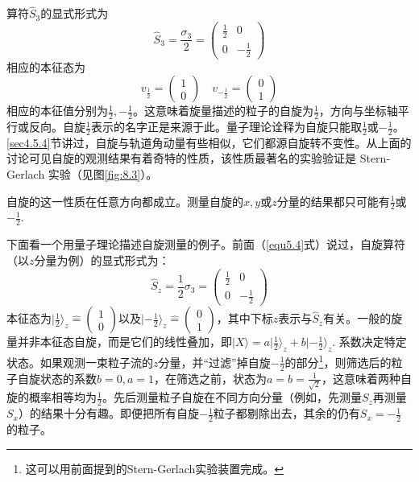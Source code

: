 算符$\hat{S}_3$的显式形式为
\begin{equation}
	\hat{S}_3 = \frac{\sigma_3}{2} =
		\begin{pmatrix}
			\frac{1}{2} & 0 \\
			0 & -\frac{1}{2}
		\end{pmatrix}
\label{equ8.46}
\end{equation}
相应的本征态为
\begin{equation}
	v_{\frac{1}{2}} =
		\begin{pmatrix}
			1 \\ 0
		\end{pmatrix}
	\quad
	v_{-\frac{1}{2}} =
		\begin{pmatrix}
			0 \\ 1
		\end{pmatrix}
\label{equ8.47}
\end{equation}
相应的本征值分别为$\frac{1}{2}, -\frac{1}{2}$。这意味着旋量描述的粒子的自旋为$\frac{1}{2}$，方向与坐标轴平行或反向。自旋$\frac{1}{2}$表示的名字正是来源于此。量子理论诠释为自旋只能取$\frac{1}{2}$或$-\frac{1}{2}$。\ref{sec4.5.4}节讲过，自旋与轨道角动量有些相似，它们都源自旋转不变性。从上面的讨论可见自旋的观测结果有着奇特的性质，该性质最著名的实验验证是 Stern-Gerlach 实验（见图\ref{fig:8.3}）。

自旋的这一性质在任意方向都成立。测量自旋的$x, y$或$z$分量的结果都只可能有$\frac{1}{2}$或$-\frac{1}{2}$.

下面看一个用量子理论描述自旋测量的例子。前面（\eqref{equ5.4}式）说过，自旋算符（以$z$分量为例）的显式形式为：
\begin{equation}
\label{equ8.48}
	\hat{S}_z = \frac{1}{2} \sigma_3 =
		\begin{pmatrix}
			\frac{1}{2} & 0 \\
			0 & -\frac{1}{2}
		\end{pmatrix}
\end{equation}
本征态为$|\frac{1}{2}\rangle_z \hat{=} \begin{pmatrix} 1 \\ 0 \end{pmatrix}$以及$|-\frac{1}{2}\rangle_z \hat{=} \begin{pmatrix} 0 \\ 1 \end{pmatrix}$，其中下标$z$表示与$\hat{S}_z$有关。一般的旋量并非本征态自旋，而是它们的线性叠加，即$|X\rangle = a |\frac{1}{2}\rangle_z + b |-\frac{1}{2}\rangle_z$. 系数决定特定状态。如果观测一束粒子流的$z$分量，并“过滤”掉自旋$-\frac{1}{2}$的部分\footnote{这可以用前面提到的Stern-Gerlach实验装置完成。}，则筛选后的粒子自旋状态的系数$b = 0, a = 1$，在筛选之前，状态为$a = b = \frac{1}{\sqrt{2}}$，这意味着两种自旋的概率相等均为$\frac{1}{2}$。先后测量粒子自旋在不同方向分量（例如，先测量$S_z$再测量$S_x$）的结果十分有趣。即便把所有自旋$-\frac{1}{2}$粒子都剔除出去，其余的仍有$S_x = -\frac{1}{2}$的粒子。

